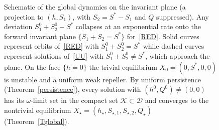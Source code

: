 \documentclass[reqno,11pt]{amsart}
\numberwithin{equation}{section}
\begin{document}
\begin{figure}[h]
{}%
\caption{ Schematic of the global dynamics on the invariant plane (a projection to $(h,S_1)$, with
$S_2=S^*-S_1$ and $Q$ suppressed). 
Any deviation $S_1^0+S_2^0-S^*$ collapses at an exponential rate onto the forward invariant plane $\{S_1+S_2=S^*\}$ for~\eqref{RED}. 
Solid curves represent orbits of~\eqref{RED} with $S_1^0+S_2^0=S^*$
while dashed curves represent solutions of~\eqref{UU} with $S_1^0+S_2^0\neq S^*$, which approach the plane. On the face $\{h=0\}$ the trivial equilibrium $X_0=(0,S^*,0,0)$ is unstable and a uniform weak
repeller. By uniform persistence (Theorem~\ref{persistence}), every solution
with  $(h^0,Q^0)\neq(0,0)$ has its $\omega$-limit set in the compact set $\mathcal{K}\subset\mathcal D$ and
converges  to the nontrivial equilibrium $X_\star=(h_\star,S_{\star,1},S_{\star,2},Q_\star)$ (Theorem~\ref{Tglobal}).
}
\label{fig:globaldynamics}
\end{figure}
\end{document}

